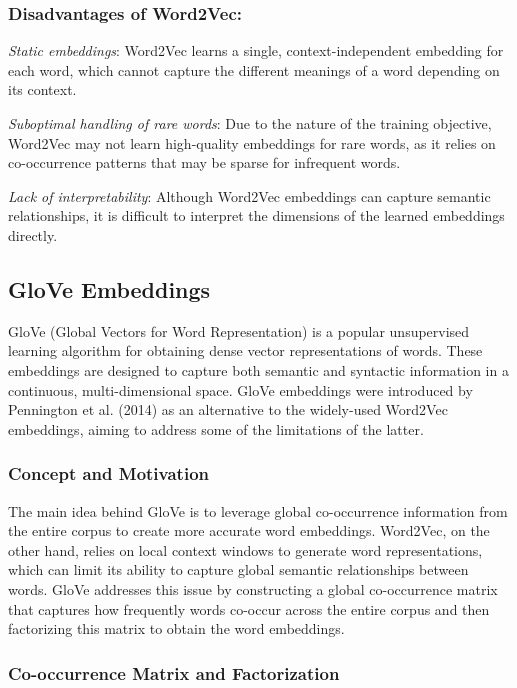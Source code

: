 \documentclass[12pt]{article}
\begin{document}
\subsubsection{Disadvantages of Word2Vec:}
\textit{Static embeddings}: Word2Vec learns a single, context-independent embedding for each word, which cannot capture the different meanings of a word depending on its context.

\textit{Suboptimal handling of rare words}: Due to the nature of the training objective, Word2Vec may not learn high-quality embeddings for rare words, as it relies on co-occurrence patterns that may be sparse for infrequent words.

\textit{Lack of interpretability}: Although Word2Vec embeddings can capture semantic relationships, it is difficult to interpret the dimensions of the learned embeddings directly.

\subsection{GloVe Embeddings}

GloVe (Global Vectors for Word Representation) is a popular unsupervised learning algorithm for obtaining dense vector representations of words. These embeddings are designed to capture both semantic and syntactic information in a continuous, multi-dimensional space. GloVe embeddings were introduced by Pennington et al. (2014) as an alternative to the widely-used Word2Vec embeddings, aiming to address some of the limitations of the latter.

\subsubsection{Concept and Motivation}

The main idea behind GloVe is to leverage global co-occurrence information from the entire corpus to create more accurate word embeddings. Word2Vec, on the other hand, relies on local context windows to generate word representations, which can limit its ability to capture global semantic relationships between words. GloVe addresses this issue by constructing a global co-occurrence matrix that captures how frequently words co-occur across the entire corpus and then factorizing this matrix to obtain the word embeddings.

\subsubsection{Co-occurrence Matrix and Factorization}
\end{document}
